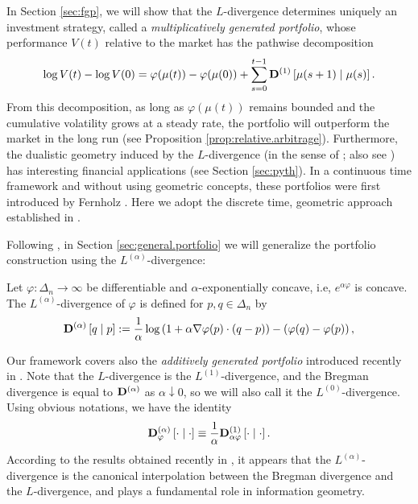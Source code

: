 \documentclass[graybox]{svmult}
\begin{document}
In Section \ref{sec:fgp}, we will show that the $L$-divergence determines uniquely an investment strategy, called a {\it multiplicatively generated portfolio}, whose performance $V(t)$ relative to the market has the pathwise decomposition
\begin{equation} \label{eqn:fgp.decomp}
\log V(t) - \log V(0) = \varphi(\mu(t)) - \varphi(\mu(0)) + \sum_{s = 0}^{t - 1} {\bf D}^{(1)}\left[\mu(s + 1) \mid \mu(s)\right]. 
\end{equation}
From this decomposition, as long as $\varphi(\mu(t))$ remains bounded and the cumulative volatility grows at a steady rate, the portfolio will outperform the market in the long run (see Proposition \ref{prop:relative.arbitrage}). Furthermore, the dualistic geometry induced by the $L$-divergence (in the sense of \cite{E83, E92}; also see \cite{A16}) has interesting financial applications (see Section \ref{sec:pyth}). In a continuous time framework and without using geometric concepts, these portfolios were first introduced by Fernholz \cite{F99, F02}. Here we adopt the discrete time, geometric approach established in \cite{PW15, PW16}.

Following \cite{W17a, W17b}, in Section \ref{sec:general.portfolio} we will generalize the portfolio construction using the $L^{(\alpha)}$-divergence:

\begin{definition} \label{def:L.alpha.divergence}
Let $\varphi: \Delta_n \rightarrow \infty$ be differentiable and $\alpha$-exponentially concave, i.e, $e^{\alpha \varphi}$ is concave. The $L^{(\alpha)}$-divergence of $\varphi$ is defined for $p, q \in \Delta_n$ by
\begin{equation} \label{eqn:L.alpha.divergence}
{\bf D}^{(\alpha)}\left[q \mid p \right] := \frac{1}{\alpha}\log \left(1 + \alpha \nabla \varphi(p) \cdot (q - p)\right) - \left( \varphi(q) - \varphi(p) \right),
\end{equation}
\end{definition}

Our framework covers also the {\it additively generated portfolio} introduced recently in \cite{KR17}. Note that the $L$-divergence is the $L^{(1)}$-divergence, and the Bregman divergence is equal to ${\bf D}^{(\alpha)}$ as $\alpha \downarrow 0$, so we will also call it the $L^{(0)}$-divergence. Using obvious notations, we have the identity
\begin{equation} \label{eqn:L.alpha.divergence.identity}
{\bf D}^{(\alpha)}_{\varphi} \left[ \cdot \mid \cdot \right] \equiv \frac{1}{\alpha} {\bf D}^{(1)}_{\alpha \varphi} \left[ \cdot \mid \cdot \right].
\end{equation}
According to the results obtained recently in \cite{W17b}, it appears that the $L^{(\alpha)}$-divergence is the canonical interpolation between the Bregman divergence and the $L$-divergence, and plays a fundamental role in information geometry.
\end{document}
